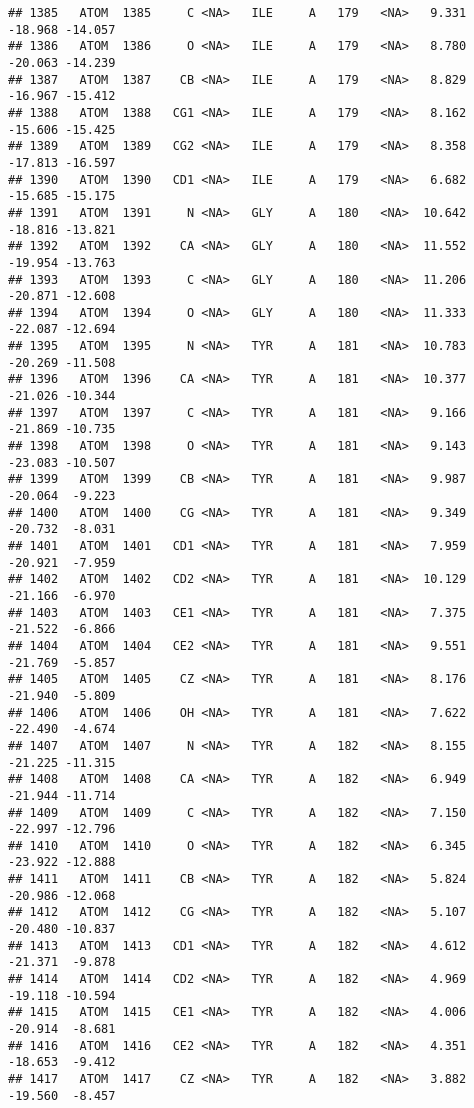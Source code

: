 \documentclass[
]{article}
\begin{document}
\begin{verbatim}
## 1385   ATOM  1385     C <NA>   ILE     A   179   <NA>   9.331 -18.968 -14.057
## 1386   ATOM  1386     O <NA>   ILE     A   179   <NA>   8.780 -20.063 -14.239
## 1387   ATOM  1387    CB <NA>   ILE     A   179   <NA>   8.829 -16.967 -15.412
## 1388   ATOM  1388   CG1 <NA>   ILE     A   179   <NA>   8.162 -15.606 -15.425
## 1389   ATOM  1389   CG2 <NA>   ILE     A   179   <NA>   8.358 -17.813 -16.597
## 1390   ATOM  1390   CD1 <NA>   ILE     A   179   <NA>   6.682 -15.685 -15.175
## 1391   ATOM  1391     N <NA>   GLY     A   180   <NA>  10.642 -18.816 -13.821
## 1392   ATOM  1392    CA <NA>   GLY     A   180   <NA>  11.552 -19.954 -13.763
## 1393   ATOM  1393     C <NA>   GLY     A   180   <NA>  11.206 -20.871 -12.608
## 1394   ATOM  1394     O <NA>   GLY     A   180   <NA>  11.333 -22.087 -12.694
## 1395   ATOM  1395     N <NA>   TYR     A   181   <NA>  10.783 -20.269 -11.508
## 1396   ATOM  1396    CA <NA>   TYR     A   181   <NA>  10.377 -21.026 -10.344
## 1397   ATOM  1397     C <NA>   TYR     A   181   <NA>   9.166 -21.869 -10.735
## 1398   ATOM  1398     O <NA>   TYR     A   181   <NA>   9.143 -23.083 -10.507
## 1399   ATOM  1399    CB <NA>   TYR     A   181   <NA>   9.987 -20.064  -9.223
## 1400   ATOM  1400    CG <NA>   TYR     A   181   <NA>   9.349 -20.732  -8.031
## 1401   ATOM  1401   CD1 <NA>   TYR     A   181   <NA>   7.959 -20.921  -7.959
## 1402   ATOM  1402   CD2 <NA>   TYR     A   181   <NA>  10.129 -21.166  -6.970
## 1403   ATOM  1403   CE1 <NA>   TYR     A   181   <NA>   7.375 -21.522  -6.866
## 1404   ATOM  1404   CE2 <NA>   TYR     A   181   <NA>   9.551 -21.769  -5.857
## 1405   ATOM  1405    CZ <NA>   TYR     A   181   <NA>   8.176 -21.940  -5.809
## 1406   ATOM  1406    OH <NA>   TYR     A   181   <NA>   7.622 -22.490  -4.674
## 1407   ATOM  1407     N <NA>   TYR     A   182   <NA>   8.155 -21.225 -11.315
## 1408   ATOM  1408    CA <NA>   TYR     A   182   <NA>   6.949 -21.944 -11.714
## 1409   ATOM  1409     C <NA>   TYR     A   182   <NA>   7.150 -22.997 -12.796
## 1410   ATOM  1410     O <NA>   TYR     A   182   <NA>   6.345 -23.922 -12.888
## 1411   ATOM  1411    CB <NA>   TYR     A   182   <NA>   5.824 -20.986 -12.068
## 1412   ATOM  1412    CG <NA>   TYR     A   182   <NA>   5.107 -20.480 -10.837
## 1413   ATOM  1413   CD1 <NA>   TYR     A   182   <NA>   4.612 -21.371  -9.878
## 1414   ATOM  1414   CD2 <NA>   TYR     A   182   <NA>   4.969 -19.118 -10.594
## 1415   ATOM  1415   CE1 <NA>   TYR     A   182   <NA>   4.006 -20.914  -8.681
## 1416   ATOM  1416   CE2 <NA>   TYR     A   182   <NA>   4.351 -18.653  -9.412
## 1417   ATOM  1417    CZ <NA>   TYR     A   182   <NA>   3.882 -19.560  -8.457

\end{verbatim}
\end{document}
